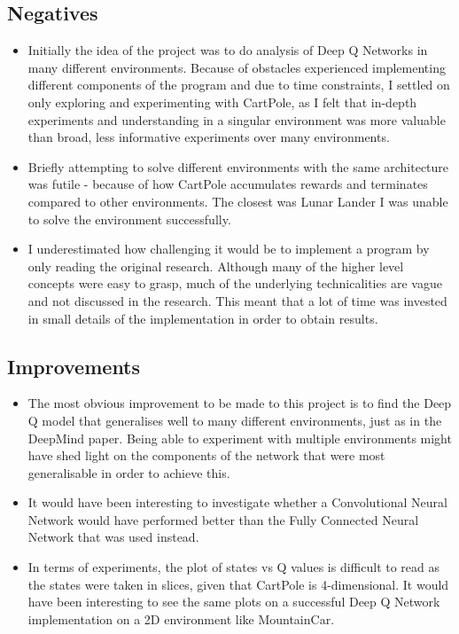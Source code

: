 \documentclass{article}
\begin{document}
\subsection{Negatives}

\begin{itemize}
    \item Initially the idea of the project was to do analysis of Deep Q Networks in many different environments. Because of obstacles experienced implementing different components of the program and due to time constraints, I settled on only exploring and experimenting with CartPole, as I felt that in-depth experiments and understanding in a singular environment was more valuable than broad, less informative experiments over many environments. 
    
    \item Briefly attempting to solve different environments with the same architecture was futile - because of how CartPole accumulates rewards and terminates compared to other environments. The closest was Lunar Lander I was unable to solve the environment successfully. 
    
    \item I underestimated how challenging it would be to implement a program by only reading the original research. Although many of the higher level concepts were easy to grasp, much of the underlying technicalities are vague and not discussed in the research. This meant that a lot of time was invested in small details of the implementation in order to obtain results.
    

\end{itemize}

\subsection{Improvements}

\begin{itemize}
    \item The most obvious improvement to be made to this project is to find the Deep Q model that generalises well to many different environments, just as in the DeepMind paper. Being able to experiment with multiple environments might have shed light on the components of the network that were most generalisable in order to achieve this.
    
    \item It would have been interesting to investigate whether a Convolutional Neural Network would have performed better than the Fully Connected Neural Network that was used instead.
    
    \item In terms of experiments, the plot of states vs Q values is difficult to read as the states were taken in slices, given that CartPole is 4-dimensional. It would have been interesting to see the same plots on a successful Deep Q Network implementation on a 2D environment like MountainCar.
    
\end{itemize}
\end{document}
